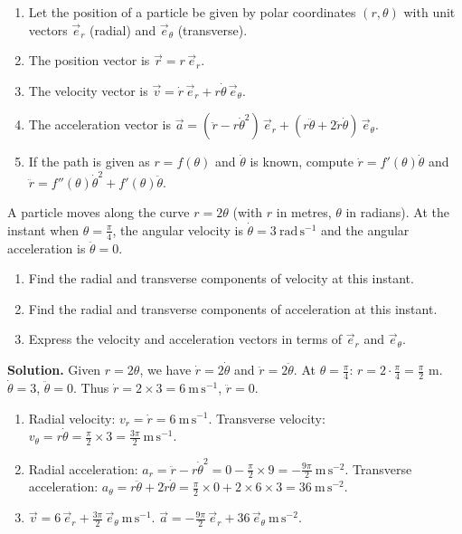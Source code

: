 \documentclass[11pt]{article}
\begin{document}
\begin{methode}
\begin{enumerate}
\item Let the position of a particle be given by polar coordinates $(r,\theta)$ with unit vectors $\vec{e}_r$ (radial) and $\vec{e}_\theta$ (transverse).
\item The position vector is $\vec{r} = r\,\vec{e}_r$.
\item The velocity vector is $\vec{v} = \dot{r}\,\vec{e}_r + r\dot{\theta}\,\vec{e}_\theta$.
\item The acceleration vector is $\vec{a} = (\ddot{r} - r\dot{\theta}^2)\,\vec{e}_r + (r\ddot{\theta} + 2\dot{r}\dot{\theta})\,\vec{e}_\theta$.
\item If the path is given as $r = f(\theta)$ and $\dot{\theta}$ is known, compute $\dot{r} = f'(\theta)\dot{\theta}$ and $\ddot{r} = f''(\theta)\dot{\theta}^2 + f'(\theta)\ddot{\theta}$.
\end{enumerate}
\end{methode}

\begin{exoresolu}
A particle moves along the curve $r = 2\theta$ (with $r$ in metres, $\theta$ in radians). At the instant when $\theta = \frac{\pi}{4}$, the angular velocity is $\dot{\theta} = 3\ \mathrm{rad\,s^{-1}}$ and the angular acceleration is $\ddot{\theta} = 0$.
\begin{enumerate}
\item Find the radial and transverse components of velocity at this instant.
\item Find the radial and transverse components of acceleration at this instant.
\item Express the velocity and acceleration vectors in terms of $\vec{e}_r$ and $\vec{e}_\theta$.
\end{enumerate}
\tcblower
\textbf{Solution.}
Given $r = 2\theta$, we have $\dot{r} = 2\dot{\theta}$ and $\ddot{r} = 2\ddot{\theta}$.
At $\theta = \frac{\pi}{4}$:
$r = 2\cdot\frac{\pi}{4} = \frac{\pi}{2}$ m.
$\dot{\theta} = 3$, $\ddot{\theta} = 0$.
Thus $\dot{r} = 2\times3 = 6\ \mathrm{m\,s^{-1}}$, $\ddot{r} = 0$.
\begin{enumerate}
\item Radial velocity: $v_r = \dot{r} = 6\ \mathrm{m\,s^{-1}}$.
Transverse velocity: $v_\theta = r\dot{\theta} = \frac{\pi}{2}\times3 = \frac{3\pi}{2}\ \mathrm{m\,s^{-1}}$.
\item Radial acceleration: $a_r = \ddot{r} - r\dot{\theta}^2 = 0 - \frac{\pi}{2}\times 9 = -\frac{9\pi}{2}\ \mathrm{m\,s^{-2}}$.
Transverse acceleration: $a_\theta = r\ddot{\theta} + 2\dot{r}\dot{\theta} = \frac{\pi}{2}\times0 + 2\times6\times3 = 36\ \mathrm{m\,s^{-2}}$.
\item $\vec{v} = 6\,\vec{e}_r + \frac{3\pi}{2}\,\vec{e}_\theta \ \mathrm{m\,s^{-1}}$.
$\vec{a} = -\frac{9\pi}{2}\,\vec{e}_r + 36\,\vec{e}_\theta \ \mathrm{m\,s^{-2}}$.
\end{enumerate}
\end{exoresolu}
\end{document}
